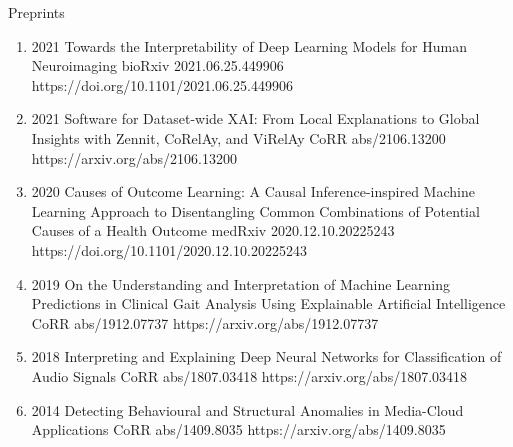 \documentclass[10pt,a4paper]{article} %
\begin{document}
\headedsection %
{Preprints}{}
{
    \begin{enumerate}

        \item[] 
                            {2021}
                            {Towards the Interpretability of Deep Learning Models for Human Neuroimaging}
                            {bioRxiv 2021.06.25.449906}
                            {https://doi.org/10.1101/2021.06.25.449906}

        \item[] 
                            {2021}
                            {Software for Dataset-wide XAI: From Local Explanations to Global Insights with Zennit, CoRelAy, and ViRelAy}
                            {CoRR abs/2106.13200}
                            {https://arxiv.org/abs/2106.13200}

        \item[] 
                            {2020}
                            {Causes of Outcome Learning: A Causal Inference-inspired Machine Learning Approach to Disentangling Common Combinations of Potential Causes of a Health Outcome}
                            {medRxiv 2020.12.10.20225243}
                            {https://doi.org/10.1101/2020.12.10.20225243}

        \item[] 
                            {2019}
                            {On the Understanding and Interpretation of Machine Learning Predictions in Clinical Gait Analysis Using Explainable Artificial Intelligence}
                            {CoRR abs/1912.07737}
                            {https://arxiv.org/abs/1912.07737}

        \item[] 
                            {2018}
                            {Interpreting and Explaining Deep Neural Networks for Classification of Audio Signals}
                            {CoRR abs/1807.03418}
                            {https://arxiv.org/abs/1807.03418}

        \item[] 
                            {2014}
                            {Detecting Behavioural and Structural Anomalies in Media-Cloud Applications}
                            {CoRR abs/1409.8035}
                            {https://arxiv.org/abs/1409.8035}

    \end{enumerate}

}
\end{document}
